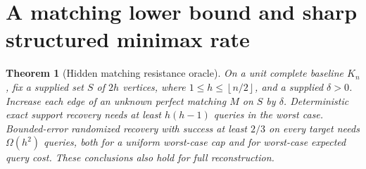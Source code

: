 \documentclass[11pt,letterpaper]{article}
\newtheorem{theorem}{Theorem}
\newcommand{\floor}[1]{\left\lfloor #1\right\rfloor}
\begin{document}
\section{A matching lower bound and sharp structured minimax rate}
\begin{theorem}[Hidden matching resistance oracle]\label{thm:matching}
On a unit complete baseline $K_n$, fix a supplied set $S$ of $2h$ vertices, where $1\le h\le\floor{n/2}$, and a supplied $\delta>0$. Increase each edge of an unknown perfect matching $M$ on $S$ by $\delta$. Deterministic exact support recovery needs at least $h(h-1)$ queries in the worst case. Bounded-error randomized recovery with success at least $2/3$ on every target needs $\Omega(h^2)$ queries, both for a uniform worst-case cap and for worst-case expected query cost. These conclusions also hold for full reconstruction.
\end{theorem}
\end{document}
